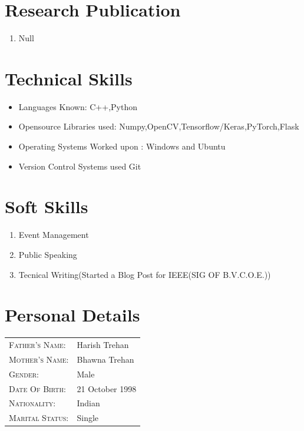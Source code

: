 \documentclass{my_cv}
\begin{document}
	\section{Research Publication}
	\begin{enumerate}
		\item Null
	\end{enumerate}
	\section{Technical Skills}
	\begin{itemize}
		\item Languages Known: C++,Python
		\item Opensource Libraries used: Numpy,OpenCV,Tensorflow/Keras,PyTorch,Flask
		\item Operating Systems Worked upon : Windows and Ubuntu
		\item Version Control Systems used Git
	\end{itemize}
	
	\section{Soft Skills}
	\begin{enumerate}
		\item Event Management
		\item Public Speaking
		\item Tecnical Writing(Started a Blog Post for IEEE(SIG OF B.V.C.O.E.))
	\end{enumerate}
	
    \section{Personal Details}
 
 	\begin{tabular}{ll}
    	\textsc{Father's Name:} & Harish Trehan \\
    	\textsc{Mother's Name:}       & Bhawna Trehan \\
    	\textsc{Gender:}         & Male \\
    	\textsc{Date Of Birth:}         & 21 October 1998 \\
    	\textsc{Nationality:}   & Indian \\
    	\textsc{Marital Status:} & Single \\
    \end{tabular}
	
\end{document}
